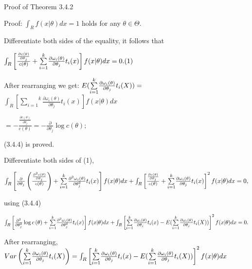 \documentclass{article}
\begin{document}
Proof of Theorem 3.4.2

Proof: $\int_{R}f(x|\theta )dx=1$ holds for any $\theta \in \Theta .$

Differentiate both sides of the equality, it follows that

$\int_{R}\left[ \frac{\frac{\partial c(\theta )}{\partial \theta _{j}}}{%
c(\theta )}+\overset{k}{\underset{i=1}{\sum }}\frac{\partial \omega
_{i}(\theta )}{\partial \theta _{j}}t_{i}(x)\right] f(x|\theta )dx=0.(1)$

After rearranging we get: $E(\overset{k}{\underset{i=1}{\sum }}\frac{%
\partial \omega _{i}(\theta )}{\partial \theta _{j}}t_{i}(X))=$ $\int_{R}%
\left[ \overset{k}{\underset{i=1}{\sum }}\frac{\partial \omega _{i}(\theta )%
}{\partial \theta _{j}}t_{i}(x)\right] f(x|\theta )dx$

$=-\frac{\frac{\partial c(\theta )}{\partial \theta _{j}}}{c(\theta )}=-%
\frac{\partial }{\partial \theta _{j}}\log c(\theta );$

(3.4.4) is proved.

Differentiate both sides of (1),

$\int_{R}\left[ \frac{\partial }{\partial \theta _{j}}\left( \frac{\frac{%
\partial ^{2}c(\theta )}{\partial \theta _{j}}}{c(\theta )}\right) +\overset{%
k}{\underset{i=1}{\sum }}\frac{\partial ^{2}\omega _{i}(\theta )}{\partial
\theta _{j}^{2}}t_{i}(x)\right] f(x|\theta )dx+\int_{R}\left[ \frac{\frac{%
\partial c(\theta )}{\partial \theta _{j}}}{c(\theta )}+\overset{k}{\underset%
{i=1}{\sum }}\frac{\partial \omega _{i}(\theta )}{\partial \theta _{j}}%
t_{i}(x)\right] ^{2}f(x|\theta )dx=0,$

using (3.4.4)

$\int_{R}\left[ \frac{\partial ^{2}}{\partial \theta _{j}^{2}}\log c\left(
\theta \right) +\overset{k}{\underset{i=1}{\sum }}\frac{\partial ^{2}\omega
_{i}(\theta )}{\partial \theta _{j}^{2}}t_{i}(x)\right] f(x|\theta
)dx+\int_{R}\left[ \overset{k}{\underset{i=1}{\sum }}\frac{\partial \omega
_{i}(\theta )}{\partial \theta _{j}}t_{i}(x)-E(\overset{k}{\underset{i=1}{%
\sum }}\frac{\partial \omega _{i}(\theta )}{\partial \theta _{j}}t_{i}(X))%
\right] ^{2}f(x|\theta )dx=0.$

After rearranging, $Var\left( \overset{k}{\underset{i=1}{\sum }}\frac{%
\partial \omega _{i}(\theta )}{\partial \theta _{j}}t_{i}(X)\right) =\int_{R}%
\left[ \overset{k}{\underset{i=1}{\sum }}\frac{\partial \omega _{i}(\theta )%
}{\partial \theta _{j}}t_{i}(x)-E(\overset{k}{\underset{i=1}{\sum }}\frac{%
\partial \omega _{i}(\theta )}{\partial \theta _{j}}t_{i}(X))\right]
^{2}f(x|\theta )dx$
\end{document}
